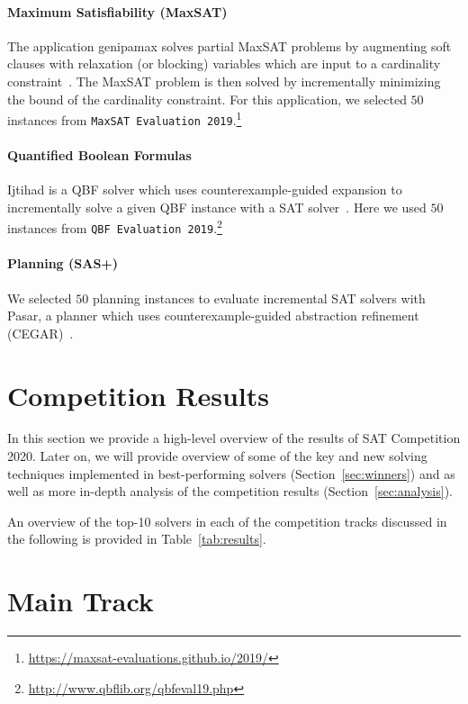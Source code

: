 \documentclass{elsarticle}
\begin{document}
\paragraph{Maximum Satisfiability (MaxSAT)}

The application \textsf{genipamax} solves partial MaxSAT problems by augmenting soft clauses with relaxation (or blocking) variables
which are input to a cardinality constraint~\cite{Philipp:2015:PBLib}. 
The MaxSAT problem is then solved by incrementally minimizing the bound of the cardinality constraint. 
For this application, we selected $50$ instances from \texttt{MaxSAT Evaluation 2019}.\footnote{\url{https://maxsat-evaluations.github.io/2019/}}

\paragraph{Quantified Boolean Formulas}
\textsf{Ijtihad} is a QBF solver which uses counterexample-guided expansion to incrementally solve a given QBF instance with a SAT solver~\cite{Bloem:2018:QBFSAT}. 
Here we used $50$ instances from \texttt{QBF Evaluation 2019}.\footnote{\url{http://www.qbflib.org/qbfeval19.php}}

\paragraph{Planning (SAS+)}
We selected $50$ planning instances to evaluate incremental SAT solvers with \textsf{Pasar}, a planner which uses counterexample-guided abstraction refinement (CEGAR)~\cite{Pasar19}. 


\section{Competition Results}
\label{sec:results}

In this section we provide a high-level overview of the results of SAT Competition 2020.
Later on, we will provide overview of some of the key and new solving techniques implemented in best-performing solvers
(Section~\ref{sec:winners}) and as well as more in-depth analysis of the competition results (Section~\ref{sec:analysis}).

An overview of the top-10 solvers in each of the competition tracks discussed in the following
is provided in Table~\ref{tab:results}.

\section{Main Track}
\end{document}
